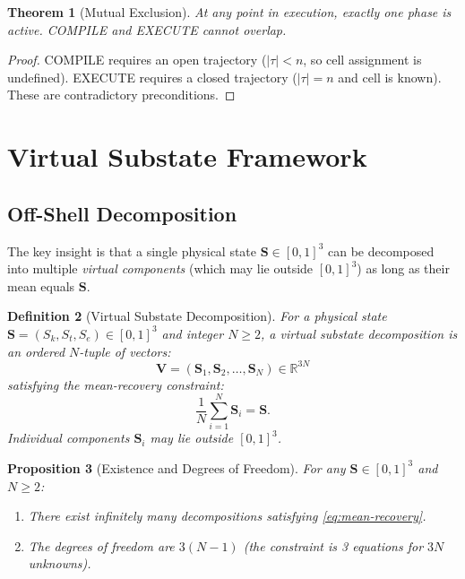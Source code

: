 \documentclass[twocolumn,11pt,a4paper]{article}
\newtheorem{theorem}{Theorem}[section]
\newtheorem{proposition}[theorem]{Proposition}
\newtheorem{definition}[theorem]{Definition}
\newcommand{\Sk}{S_{k}}
\newcommand{\St}{S_{t}}
\newcommand{\Se}{S_{e}}
\newcommand{\Stuple}{\mathbf{S}}
\begin{document}
\begin{theorem}[Mutual Exclusion]
At any point in execution, exactly one phase is active. COMPILE and EXECUTE cannot overlap.
\end{theorem}

\begin{proof}
COMPILE requires an open trajectory ($|\tau| < n$, so cell assignment is undefined). EXECUTE requires a closed trajectory ($|\tau| = n$ and cell is known). These are contradictory preconditions.
\end{proof}

\section{Virtual Substate Framework}
\label{sec:virtual}

\subsection{Off-Shell Decomposition}

The key insight is that a single physical state $\Stuple \in [0,1]^3$ can be decomposed into multiple \emph{virtual components} (which may lie outside $[0,1]^3$) as long as their mean equals $\Stuple$.

\begin{definition}[Virtual Substate Decomposition]
For a physical state $\Stuple = (\Sk, \St, \Se) \in [0,1]^3$ and integer $N \geq 2$, a \emph{virtual substate decomposition} is an ordered $N$-tuple of vectors:
\begin{equation}
  \mathbf{V} = (\Stuple_1, \Stuple_2, \ldots, \Stuple_N) \in \mathbb{R}^{3N}
\end{equation}
satisfying the \emph{mean-recovery constraint}:
\begin{equation}
  \frac{1}{N}\sum_{i=1}^{N} \Stuple_i = \Stuple.
  \label{eq:mean-recovery}
\end{equation}
Individual components $\Stuple_i$ may lie outside $[0,1]^3$.
\end{definition}

\begin{proposition}[Existence and Degrees of Freedom]
For any $\Stuple \in [0,1]^3$ and $N \geq 2$:
\begin{enumerate}[nosep,label=(\roman*)]
  \item There exist infinitely many decompositions satisfying \eqref{eq:mean-recovery}.
  \item The degrees of freedom are $3(N-1)$ (the constraint is 3 equations for $3N$ unknowns).
\end{enumerate}
\end{proposition}
\end{document}
